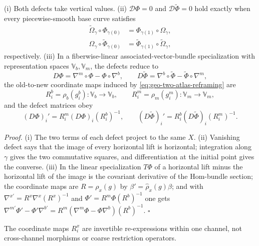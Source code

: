 (i) Both defects take vertical values. (ii) \(\mathcal D\Phi=0\) and \(\mathcal D\widetilde\Phi=0\)
hold exactly when every piecewise-smooth base curve satisfies
\begin{align}
\widetilde\Omega_\gamma\circ\Phi_{\gamma(0)}
&=\Phi_{\gamma(1)}\circ\Omega_\gamma,
\label{eq:geo-phi-parallelness}\\
\Omega_\gamma\circ\widetilde\Phi_{\gamma(0)}
&=\widetilde\Phi_{\gamma(1)}\circ\widetilde\Omega_\gamma,
\label{eq:geo-tildephi-parallelness}
\end{align}
respectively. (iii) In a fiberwise-linear associated-vector-bundle specialization with
representation spaces \(\mathbb V_b,\mathbb V_m\), the defects reduce to
\begin{equation}
D\Phi=\nabla^m\circ\Phi-\Phi\circ\nabla^b,
\qquad
D\widetilde\Phi=\nabla^b\circ\widetilde\Phi-\widetilde\Phi\circ\nabla^m,
\label{eq:geo-linear-covariant-defects}
\end{equation}
the old-to-new coordinate maps induced by \eqref{eq:geo-two-atlas-reframing} are
\begin{equation}
R_i^b=\rho_b(g_i^b):\mathbb V_b\longrightarrow\mathbb V_b,
\qquad
R_i^m=\rho_m(g_i^m):\mathbb V_m\longrightarrow\mathbb V_m,
\label{eq:geo-linear-coordinate-maps}
\end{equation}
and the defect matrices obey
\begin{equation}
(D\Phi)_i'=R_i^m(D\Phi)_i(R_i^b)^{-1},
\qquad
(D\widetilde\Phi)_i'=R_i^b(D\widetilde\Phi)_i(R_i^m)^{-1}.
\label{eq:geo-defect-gauge-laws}
\end{equation}

\noindent\emph{Proof.}
(i) The two terms of each defect project to the same \(X\). (ii) Vanishing defect says that the
image of every horizontal lift is horizontal; integration along \(\gamma\) gives the two
commutative squares, and differentiation at the initial point gives the converse. (iii) In the
linear specialization \(T\Phi\) of a horizontal lift minus the horizontal lift of the image is the
covariant derivative of the Hom-bundle section; the coordinate maps are \(R=\rho_x(g)\) by
\(\beta'=\widehat\rho_x(g)\beta\); and with \(\nabla^{x\prime}=R^x\nabla^x(R^x)^{-1}\) and
\(\Phi'=R^m\Phi(R^b)^{-1}\) one gets
\(\nabla^{m\prime}\Phi'-\Phi'\nabla^{b\prime}=R^m(\nabla^m\Phi-\Phi\nabla^b)(R^b)^{-1}\).
\hfill$\square$

The coordinate maps \(R_i^x\) are invertible re-expressions within one channel, not cross-channel
morphisms or coarse restriction operators.

